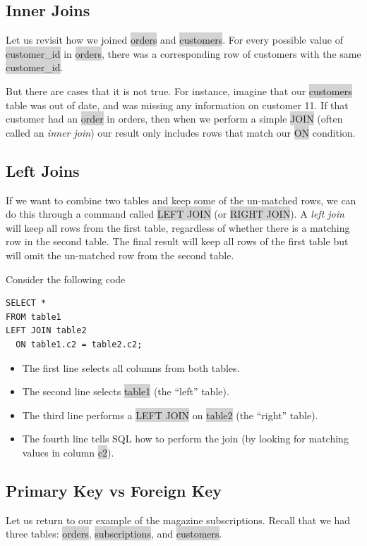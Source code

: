 \documentclass[11pt]{article}
\begin{document}
{{\subsection{Inner Joins}
Let us revisit how we joined \colorbox{lightgray}{orders} and \colorbox{lightgray}{customers}. For every possible value of \colorbox{lightgray}{customer\_id} in \colorbox{lightgray}{orders}, there was a corresponding row of customers with the same \colorbox{lightgray}{customer\_id}.

But there are cases that it is not true. For instance, imagine that our \colorbox{lightgray}{customers} table was out of date, and was missing any information on customer 11. If that customer had an \colorbox{lightgray}{order} in orders, then when we perform a simple \colorbox{lightgray}{JOIN} (often called an \textit{inner join}) our result only includes rows that match our \colorbox{lightgray}{ON} condition.

\subsection{Left Joins}
If we want to combine two tables and keep some of the un-matched rows, we can do this through a command called \colorbox{lightgray}{LEFT JOIN} (or \colorbox{lightgray}{RIGHT JOIN}). A \textit{left join} will keep all rows from the first table, regardless of whether there is a matching row in the second table. The final result will keep all rows of the first table but will omit the un-matched row from the second table.

Consider the following code 
\begin{lstlisting}
SELECT *
FROM table1
LEFT JOIN table2
  ON table1.c2 = table2.c2;
\end{lstlisting}
\begin{itemize}[leftmargin = *]
\item The first line selects all columns from both tables.
\item The second line selects \colorbox{lightgray}{table1} (the “left” table).
\item The third line performs a \colorbox{lightgray}{LEFT JOIN} on \colorbox{lightgray}{table2} (the “right” table).
\item The fourth line tells SQL how to perform the join (by looking for matching values in column \colorbox{lightgray}{c2}).
\end{itemize}

\subsection{Primary Key vs Foreign Key}
Let us return to our example of the magazine subscriptions. Recall that we had three tables: \colorbox{lightgray}{orders}, \colorbox{lightgray}{subscriptions}, and \colorbox{lightgray}{customers}.

}}
\end{document}
